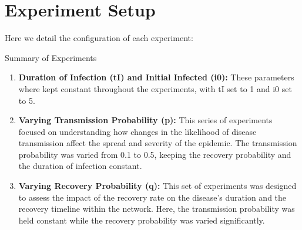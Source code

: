 \documentclass[
	report, %
	11pt, %
]{CSUniSchoolLabReport}
\newcounter{ct}
\begin{document}
\section{Experiment Setup}

Here we detail the configuration of each experiment:

\begin{table}[H]
    \centering
	\captionsetup{justification=centering}
	\caption{Summary of Experiments}  %
    \label{tab:experiments}           %

\end{table}	
\begin{enumerate}

\item \textbf{Duration of Infection (tI) and Initial Infected (i0):} These parameters where kept constant throughout the experiments, with tI set to 1 and i0 set to 5.

\item \textbf{Varying Transmission Probability (p):}
This series of experiments focused on understanding how changes in the likelihood of disease transmission affect the spread and severity of the epidemic. The transmission probability was varied from 0.1 to 0.5, keeping the recovery probability and the duration of infection constant.

\item \textbf{Varying Recovery Probability (q):}
This set of experiments was designed to assess the impact of the recovery rate on the disease's duration and the recovery timeline within the network. Here, the transmission probability was held constant while the recovery probability was varied significantly.

\end{enumerate}
\end{document}
